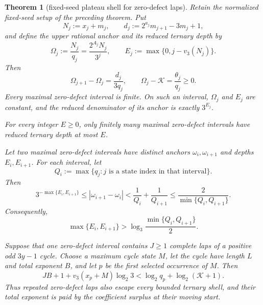 \documentclass[11pt]{article}
\newtheorem{theorem}{Theorem}
\begin{document}
\begin{theorem}[fixed-seed plateau shell for zero-defect laps]
Retain the normalized fixed-seed setup of the preceding theorem.  Put
\[
  N_j:=x_j+m_j,
  \qquad
  d_j:=2^{a_j}m_{j+1}-3m_j+1,
  \tag{51}
\]
and define the upper rational anchor and its reduced ternary depth by
\[
  \Omega_j:=\frac{N_j}{q_j}
  =\frac{2^{A_j}N_j}{3^j},
  \qquad
  E_j:=\max\{0,j-v_3(N_j)\}.
  \tag{52}
\]
Then
\[
\boxed{
  \Omega_{j+1}-\Omega_j=\frac{d_j}{3q_j},
  \qquad
  \Omega_j-\mathcal K=\frac{\theta_j}{q_j}\geq0.}
\tag{53}
\]
Every maximal zero-defect interval is finite.  On such an interval,
$\Omega_j$ and $E_j$ are constant, and the reduced denominator of its
anchor is exactly $3^{E_j}$.

For every integer $E\geq0$, only finitely many maximal zero-defect
intervals have reduced ternary depth at most $E$.

Let two maximal zero-defect intervals have distinct anchors
$\omega_i,\omega_{i+1}$ and depths $E_i,E_{i+1}$.  For each interval, let
\[
  Q_i:=\max\{q_j:j\text{ is a state index in that interval}\}.
  \tag{54}
\]
Then
\[
\boxed{
  3^{-\max\{E_i,E_{i+1}\}}
  \leq|\omega_{i+1}-\omega_i|
  <\frac1{Q_i}+\frac1{Q_{i+1}}
  \leq\frac2{\min\{Q_i,Q_{i+1}\}}.}
\tag{55}
\]
Consequently,
\[
\boxed{
  \max\{E_i,E_{i+1}\}
  >\log_3\frac{\min\{Q_i,Q_{i+1}\}}2.}
\tag{56}
\]

Suppose that one zero-defect interval contains $J\geq1$ complete laps of
a positive odd $3y-1$ cycle.  Choose a maximum cycle state $M$, let the
cycle have length $L$ and total exponent $B$, and let $p$ be the first
selected occurrence of $M$.  Then
\[
\boxed{
  JB+1+v_3(x_p+M)\log_2 3
  <\log_2q_p+\log_2(\mathcal K+1).}
\tag{57}
\]
Thus repeated zero-defect laps also escape every bounded ternary shell,
and their total exponent is paid by the coefficient surplus at their moving
start.
\end{theorem}
\end{document}
